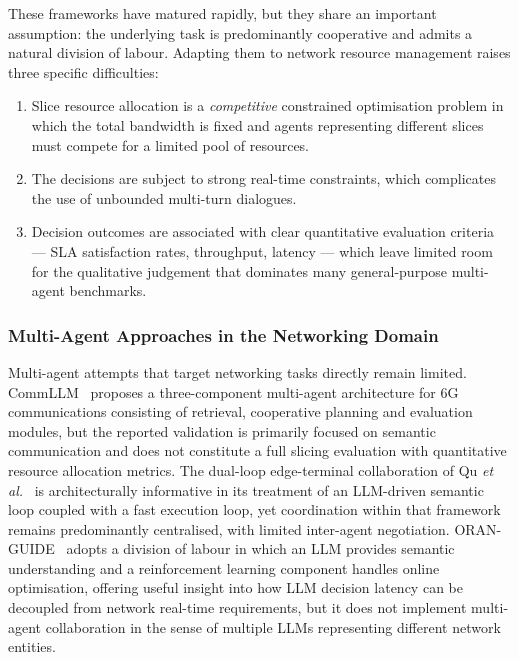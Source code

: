 These frameworks have matured rapidly, but they share an important assumption: the underlying task is predominantly cooperative and admits a natural division of labour. Adapting them to network resource management raises three specific difficulties:

\begin{enumerate}
    \item Slice resource allocation is a \emph{competitive} constrained optimisation problem in which the total bandwidth is fixed and agents representing different slices must compete for a limited pool of resources.
    \item The decisions are subject to strong real-time constraints, which complicates the use of unbounded multi-turn dialogues.
    \item Decision outcomes are associated with clear quantitative evaluation criteria --- SLA satisfaction rates, throughput, latency --- which leave limited room for the qualitative judgement that dominates many general-purpose multi-agent benchmarks.
\end{enumerate}

\subsubsection{Multi-Agent Approaches in the Networking Domain}

Multi-agent attempts that target networking tasks directly remain limited. CommLLM~\cite{jiang2024commllm} proposes a three-component multi-agent architecture for 6G communications consisting of retrieval, cooperative planning and evaluation modules, but the reported validation is primarily focused on semantic communication and does not constitute a full slicing evaluation with quantitative resource allocation metrics. The dual-loop edge-terminal collaboration of Qu \emph{et al.}~\cite{qu2025dualloop} is architecturally informative in its treatment of an LLM-driven semantic loop coupled with a fast execution loop, yet coordination within that framework remains predominantly centralised, with limited inter-agent negotiation. ORAN-GUIDE~\cite{lotfi2025oranguide} adopts a division of labour in which an LLM provides semantic understanding and a reinforcement learning component handles online optimisation, offering useful insight into how LLM decision latency can be decoupled from network real-time requirements, but it does not implement multi-agent collaboration in the sense of multiple LLMs representing different network entities.

